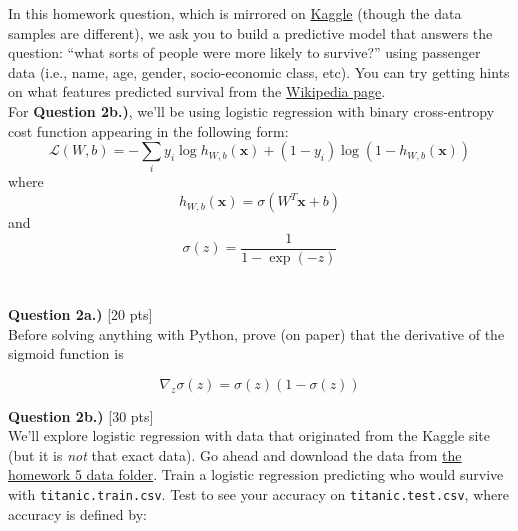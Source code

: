 \documentclass[paper=a4, fontsize=11pt]{scrartcl} %
\begin{document}
In this homework question, which is mirrored on \href{https://www.kaggle.com/competitions/titanic/overview}{Kaggle} (though the data samples are different), we ask you to build a predictive model that answers the question: “what sorts of people were more likely to survive?” using passenger data (i.e., name, age, gender, socio-economic class, etc). You can try getting hints on what features predicted survival from the \href{https://en.wikipedia.org/wiki/Sinking_of_the_Titanic#Casualties_and_survivors}{Wikipedia page}. \\

For \textbf{Question 2b.)}, we'll be using logistic regression with binary cross-entropy cost function appearing in the following form: \\

\begin{equation}
    \mathcal{L}(W, b) = -\sum_i y_i \log{ h_{W,b}(\textbf{x}) } + (1 - y_i) \log{( 1 - h_{W,b}(\textbf{x})) } \nonumber
\end{equation}
where 
\begin{equation}
h_{W,b}(\textbf{x}) = \sigma \left( W^T\textbf{x} + b \right) \nonumber
\end{equation}
and
\begin{equation}
\sigma(z) = \frac{1}{1 - \exp(-z)} \nonumber
\end{equation} \\
\\

\vspace{1cm}
{\Large \textbf{Question 2a.)} [20 pts]} \\

Before solving anything with Python, prove (on paper) that the derivative of the sigmoid function is 

\begin{equation}
    \nabla_z \sigma(z) = \sigma(z) \left(1 - \sigma(z)\right) \nonumber
\end{equation}

\vspace{1cm}
{\Large \textbf{Question 2b.)} [30 pts]} \\

We'll explore logistic regression with data that originated from the Kaggle site (but it is \emph{not} that exact data). Go ahead and download the data from \href{https://course.ccs.neu.edu/cs6220/homework-5/data/titanic/}{the homework 5 data folder}. Train a logistic regression predicting who would survive with \verb"titanic.train.csv". Test to see your accuracy on \verb"titanic.test.csv", where accuracy is defined by:
\end{document}
